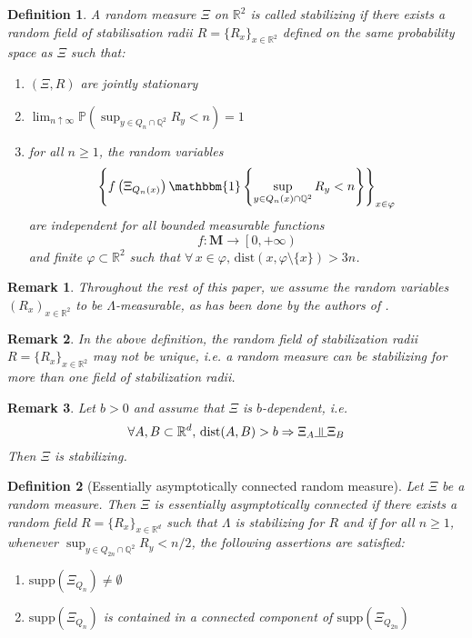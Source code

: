 \documentclass[10pt,a4paper]{amsart}
\theoremstyle{exampstyle}
\newtheorem{Definition}{Definition}
\newtheorem{Remark}{Remark}
\theoremstyle{exampnotations}
\newcommand{\indep}{\rotatebox[origin=c]{90}{$\models$}}
\begin{document}
\begin{Definition}
\label{Def.stabilizing}
A random measure $\Xi$ on $\mathbb{R}^{2}$ is called \emph{stabilizing} if there exists a random field of stabilisation radii $R = \lbrace R_{x} \rbrace _{x \in \mathbb{R}^{2}}$ defined on the same probability space as $\Xi$ such that:
\begin{enumerate}[label = (\arabic*)]
\item $(\Xi,R)$ are jointly stationary
\item $\displaystyle \lim_{n \uparrow \infty} \mathbb{P}\left(\sup _{y \in Q_{n} \cap \mathbb{Q}^{2}} R_{y} < n\right) = 1$
\item for all $n \geq 1$, the random variables 
$$ \left\lbrace f\left(\Xi_{Q_{n}(x)}\right)\mathbbm{1}\left\lbrace \sup_{y \in Q_{n}(x) \cap \mathbb{Q}^{2}} R_{y} < n \right\rbrace \right\rbrace _{x \in \varphi}$$
are independent for all bounded measurable functions $$f : \mathbf{M} \to \left[0, +\infty \right)$$ and finite $\varphi \subset \mathbb{R}^{2}$ such that $\forall \, x \in \varphi, \, \text{dist}(x, \varphi \setminus \lbrace x \rbrace ) > 3n$.
\end{enumerate}
\end{Definition}
\begin{Remark}
Throughout the rest of this paper, we assume the random variables $(R_x)_{x \in \mathbb{R}^{2}}$ to be $\Lambda$-measurable, as has been done by the authors of \cite{hirsch_continuum_2017}.
\end{Remark}
\begin{Remark}
In the above definition, the random field of stabilization radii $R = \lbrace R_{x} \rbrace _{x \in \mathbb{R}^{2}}$ may not be unique, i.e. a random measure can be stabilizing for more than one field of stabilization radii.
\end{Remark}
\begin{Remark}
Let $b > 0$ and assume that $\Xi$ is $b$-dependent, i.e. $$\forall A,B \subset \mathbb{R}^{d}, \, \text{dist}(A,B) > b \Rightarrow \Xi_{A} \indep \Xi_{B}$$ Then $\Xi$ is stabilizing. 
\end{Remark} 

\begin{Definition}[Essentially asymptotically connected random measure]
Let $\Xi$ be a random measure. Then $\Xi$ is \emph{essentially asymptotically connected} if there exists a random field $R = \lbrace R_{x} \rbrace_{x \in \mathbb{R}^{d}}$ such that $\Lambda$ is stabilizing for $R$ and if for all $n \geq 1$, whenever $\displaystyle \sup_{y \in Q_{2n} \cap \mathbb{Q}^{2}} R_{y} < n/2$, the following assertions are satisfied:
\begin{enumerate}[label = (\arabic*)]
\item $\text{supp}(\Xi_{Q_{n}}) \neq \emptyset$
\item $\text{supp}(\Xi_{Q_{n}})$ is contained in a connected component of $\text{supp}(\Xi_{Q_{2n}})$
\end{enumerate}
\end{Definition}
\end{document}
